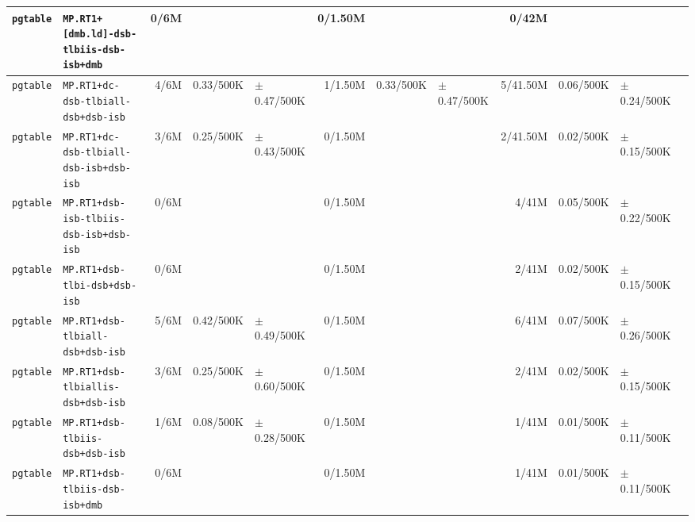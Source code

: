 \begin{tabular}{l l  | r r l | r r l | r r l l}
        \verb|pgtable| &               \verb|MP.RT1+[dmb.ld]-dsb-tlbiis-dsb-isb+dmb| &           0/6M &                       &                   &        0/1.50M &                       &                   &          0/42M &                       &                    & \\ \hline 
        \verb|pgtable| &                    \verb|MP.RT1+dc-dsb-tlbiall-dsb+dsb-isb| &           4/6M &             0.33/500K &   $\pm$ 0.47/500K &        1/1.50M &             0.33/500K &   $\pm$ 0.47/500K &       5/41.50M &             0.06/500K &    $\pm$ 0.24/500K & \\ \hline 
        \verb|pgtable| &                \verb|MP.RT1+dc-dsb-tlbiall-dsb-isb+dsb-isb| &           3/6M &             0.25/500K &   $\pm$ 0.43/500K &        0/1.50M &                       &                   &       2/41.50M &             0.02/500K &    $\pm$ 0.15/500K & \\ \hline 
        \verb|pgtable| &                \verb|MP.RT1+dsb-isb-tlbiis-dsb-isb+dsb-isb| &           0/6M &                       &                   &        0/1.50M &                       &                   &          4/41M &             0.05/500K &    $\pm$ 0.22/500K & \\ \hline 
        \verb|pgtable| &                          \verb|MP.RT1+dsb-tlbi-dsb+dsb-isb| &           0/6M &                       &                   &        0/1.50M &                       &                   &          2/41M &             0.02/500K &    $\pm$ 0.15/500K & \\ \hline 
        \verb|pgtable| &                       \verb|MP.RT1+dsb-tlbiall-dsb+dsb-isb| &           5/6M &             0.42/500K &   $\pm$ 0.49/500K &        0/1.50M &                       &                   &          6/41M &             0.07/500K &    $\pm$ 0.26/500K & \\ \hline 
        \verb|pgtable| &                     \verb|MP.RT1+dsb-tlbiallis-dsb+dsb-isb| &           3/6M &             0.25/500K &   $\pm$ 0.60/500K &        0/1.50M &                       &                   &          2/41M &             0.02/500K &    $\pm$ 0.15/500K & \\ \hline 
        \verb|pgtable| &                        \verb|MP.RT1+dsb-tlbiis-dsb+dsb-isb| &           1/6M &             0.08/500K &   $\pm$ 0.28/500K &        0/1.50M &                       &                   &          1/41M &             0.01/500K &    $\pm$ 0.11/500K & \\ \hline 
        \verb|pgtable| &                        \verb|MP.RT1+dsb-tlbiis-dsb-isb+dmb| &           0/6M &                       &                   &        0/1.50M &                       &                   &          1/41M &             0.01/500K &    $\pm$ 0.11/500K & \\ \hline 

\end{tabular}
